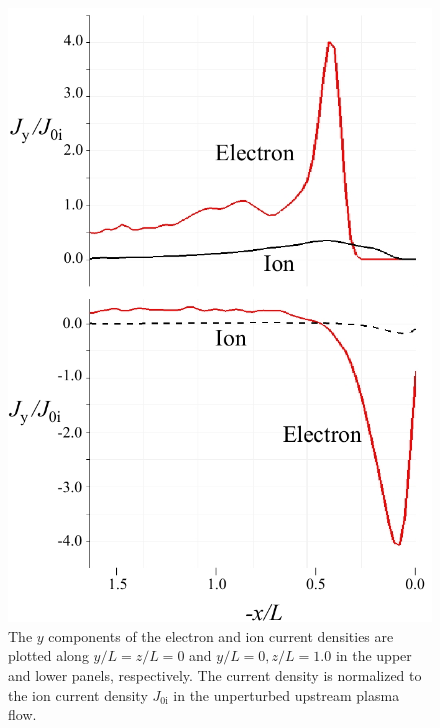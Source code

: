\documentclass[draft,jgrga]{agutex2015}
\begin{document}
\begin{article}
\begin{figure}[t]
\centering
\noindent\includegraphics[width=12cm]{./figures/Fig_5_bb-crop.pdf}
\caption{
The $y$ components of the electron and ion current densities are plotted 
along $y/L=z/L=0$ and $y/L=0, z/L=1.0$ in the upper and lower panels, respectively.
The current density is normalized to the ion current density $J_\mathrm{0i}$
in the unperturbed upstream plasma flow.
}
\label{fig:5}
\end{figure}


\end{article}
\end{document}
